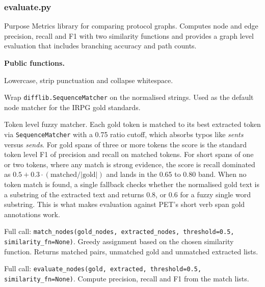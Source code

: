\documentclass{article}
\begin{document}
\subsubsection{evaluate.py}

\begin{codeconceptbox}{Purpose}
Metrics library for comparing protocol graphs. Computes node and edge
precision, recall and F1 with two similarity functions and provides a
graph level evaluation that includes branching accuracy and path
counts.
\end{codeconceptbox}

\textbf{Public functions.}

\begin{description}[leftmargin=2em, style=nextline]
\item[\texttt{normalize\_text(text)}]
Lowercase, strip punctuation and collapse whitespace.
\item[\texttt{text\_similarity(a, b)}]
Wrap \texttt{difflib.SequenceMatcher} on the normalised strings.
Used as the default node matcher for the IRPG gold standards.
\item[\texttt{token\_overlap\_similarity(gold\_text, extracted\_text)}]
Token level fuzzy matcher. Each gold token is matched to its best
extracted token via \texttt{SequenceMatcher} with a 0.75 ratio
cutoff, which absorbs typos like \emph{sents} versus \emph{sends}.
For gold spans of three or more tokens the score is the standard
token level F1 of precision and recall on matched tokens. For short
spans of one or two tokens, where any match is strong evidence, the
score is recall dominated as
$0.5 + 0.3 \cdot (\text{matched} / |\text{gold}|)$ and lands in the
0.65 to 0.80 band. When no token match is found, a single fallback
checks whether the normalised gold text is a substring of the
extracted text and returns 0.8, or 0.6 for a fuzzy single word
substring. This is what makes evaluation against PET's short verb
span gold annotations work.
\item[\texttt{match\_nodes}]
Full call:
\texttt{match\_nodes(gold\_nodes,\allowbreak{} extracted\_nodes,\allowbreak{}
threshold=0.5,\allowbreak{} similarity\_fn=None)}.
Greedy assignment based on the chosen similarity function. Returns
matched pairs, unmatched gold and unmatched extracted lists.
\item[\texttt{evaluate\_nodes}]
Full call:
\texttt{evaluate\_nodes(gold,\allowbreak{} extracted,\allowbreak{}
threshold=0.5,\allowbreak{} similarity\_fn=None)}.
Compute precision, recall and F1 from the match lists.
\item[\texttt{evaluate\_edges(gold, extracted, node\_mapping)}]

\end{description}
\end{document}
